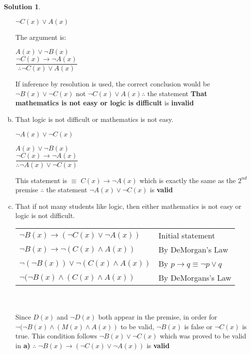 \documentclass{article}
\theoremstyle{definition}
\newtheorem*{solution}{Solution}
\begin{document}
\begin{solution}
\begin{enumerate}[a)]
      $\neg C(x) \vee A(x)$

      The argument is:

      $A(x) \vee \neg B(x)$ \\
      $\displaystyle \dfrac{\neg C(x) \rightarrow \neg A(x)}{\therefore \neg C(x) \vee A(x)}$

      If inference by resolution is used, the correct conclusion would be $ \neg B(x) \vee \neg C(x)$ not $\neg C(x)
      \vee A(x) \therefore$ the statement \textbf{That mathematics is not easy or logic is difficult} is
      \textbf{invalid}

\item That logic is not difficult or mathematics is not easy.

      $\neg A(x) \vee \neg C(x)$

      $A(x) \vee \neg B(x)$ \\
      $\displaystyle \dfrac{\neg C(x) \rightarrow \neg A(x)}{\therefore \neg A(x) \vee \neg C(x)}$

      This statement is $\equiv$ $C(x) \rightarrow \neg A(x)$ which is exactly the same as the $2^{nd}$ premise
      $\therefore$ the statement $\neg A(x) \vee \neg C(x)$ is \textbf{valid}

\item That if not many students like logic, then either mathematics is not easy or logic is not difficult.

      \begin{tabular}{ll}
        $\neg B(x) \rightarrow ( \neg C(x) \vee \neg A(x) )$ & Initial statement \\
        $\neg B(x) \rightarrow \neg ( C(x) \wedge A(x))$     & By DeMorgan's Law \\
        $\neg(\neg B(x)) \vee \neg ( C(x) \wedge A(x))$      & By $p \rightarrow q \equiv \neg p \vee q$ \\
        $\neg ( \neg B(x) \wedge (C(x) \wedge A(x))$         & By DeMorgans's Law
      \end{tabular} \\ \ \\
      Since $D(x)$ and $\neg D(x)$ both appear in the premise, in order for $\neg ( \neg B(x) \wedge (M(x) \wedge
      A(x))$ to be valid, $\neg B(x)$ is false or $ \neg C(x)$ is true. This condition follows $\neg B(x) \vee \neg
      C(x)$ which was proved to be valid in \textbf{a)} $\therefore$ $\neg B(x) \rightarrow ( \neg C(x) \vee \neg
      A(x) )$ is \textbf{valid}

\end{enumerate}
\end{solution}
\end{document}
